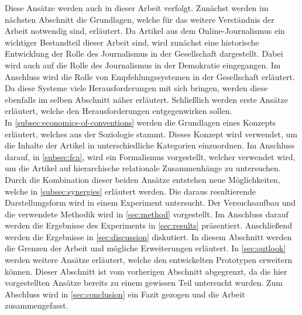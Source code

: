 Diese Ansätze werden auch in dieser Arbeit verfolgt.
Zunächst werden im nächsten Abschnitt die Grundlagen, welche für das weitere Verständnis der Arbeit notwendig sind, erläutert.
Da Artikel aus dem Online-Journalismus ein wichtiger Bestandteil dieser Arbeit sind, wird zunächst eine historische Entwicklung der Rolle des Journalismus in der Gesellschaft dargestellt.
Dabei wird auch auf die Rolle des Journalismus in der Demokratie eingegangen.
Im Anschluss wird die Rolle von Empfehlungssystemen in der Gesellschaft erläutert.
Da diese Systeme viele Herausforderungen mit sich bringen, werden diese ebenfalls im selben Abschnitt näher erläutert.
Schließlich werden erste Ansätze erläutert, welche den Herausforderungen entgegenwirken sollen. \\

In \autoref{subsec:economics-of-conventions} werden die Grundlagen eines Konzepts erläutert, welches aus der Soziologie stammt.
Dieses Konzept wird verwendet, um die Inhalte der Artikel in unterschiedliche Kategorien einzuordnen.
Im Anschluss darauf, in \autoref{subsec:fca}, wird ein Formalismus vorgestellt, welcher verwendet wird, um die Artikel auf hierarchische relationale Zusammenhänge zu untersuchen.
Durch die Kombination dieser beiden Ansätze entstehen neue Möglichkeiten, welche in \autoref{subsec:synergies} erläutert werden.
Die daraus resultierende Darstellungsform wird in einem Experiment untersucht.
Der Versuchsaufbau und die verwendete Methodik wird in \autoref{sec:method} vorgestellt.
Im Anschluss darauf werden die Ergebnisse des Experiments in \autoref{sec:results} präsentiert.
Anschließend werden die Ergebnisse in \autoref{sec:discussion} diskutiert.
In diesem Abschnitt werden die Grenzen der Arbeit und mögliche Erweiterungen erläutert.
In \autoref{sec:outlook} werden weitere Ansätze erläutert, welche den entwickelten Prototypen erweitern können.
Dieser Abschnitt ist vom vorherigen Abschnitt abgegrenzt, da die hier vorgestellten Ansätze bereits zu einem gewissen Teil untersucht wurden.
Zum Abschluss wird in \autoref{sec:conclusion} ein Fazit gezogen und die Arbeit zusammengefasst.
